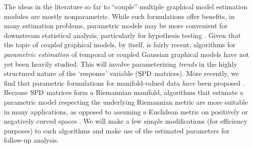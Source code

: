 The ideas in the literature so far to ``couple'' multiple graphical model estimation modules are mostly nonparametric. 
While such formulations offer benefits, in many estimation problems, 
parametric models may 
be more convenient for downstream statistical analysis,
particularly for hypothesis testing \citep{hardle1993comparing,geer2000empirical,roehrig1988conditions}.
Given that the topic of \textit{coupled} graphical models, by itself, is fairly recent, algorithms for {\em parametric estimation} of 
temporal or coupled Gaussian graphical models have not yet been heavily studied. 
This will involve parameterizing {\em trends} in the highly structured nature of the `response' variable ($\text{SPD}$ matrices). 
More recently, we find that parametric formulations for manifold-valued data {\em have} been proposed \citep{hjkimcvpr2014,cornea2016regression}. %
Because $\text{SPD}$ matrices form a Riemannian manifold, algorithms
that estimate a parametric model respecting the underlying Riemannian metric are more suitable in many applications,
as opposed to assuming a Euclidean metric 
on positively or negatively curved spaces \citep{xie2010statistical, fletcher2007riemannian, jayasumanakernel}. We will make a few simple modifications 
(for efficiency purposes) to such algorithms and make use of the estimated parameters for follow-up analysis.



